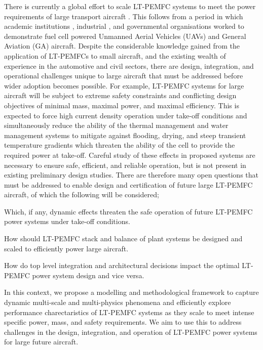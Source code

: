 There is currently a global effort to scale LT-PEMFC systems to meet the power requirements of large transport aircraft \cite{weeksZeroAviaReceivesFAA2025, retallackCommercialAircraftManufacturer2023, NEWBORNNExtGeneration, woodScalabilityHydrogenFuel}.
This follows from a period in which academic institutions \cite{kalloFuelCellSystems2013}, industrial \cite{lapena-reyFirstFuelCellManned2010}, and governmental organisations \cite{noll2004investigation} worked to demonstrate fuel cell powered Unmanned Aerial Vehicles (UAVs) and General Aviation (GA) aircraft.
Despite the considerable knowledge gained from the application of LT-PEMFCs to small aircraft, and the existing wealth of experience in the automotive and civil sectors, there are  design, integration, and operational challenges unique to large aircraft that must be addressed before wider adoption becomes possible.
For example, LT-PEMFC systems for large aircraft will be subject to extreme safety constraints and conflicting design objectives of minimal mass, maximal power, and maximal efficiency. This is expected to force high current density operation under take-off conditions and simultaneously reduce the ability of the thermal management and water management systems to mitigate against flooding, drying, and steep transient temperature gradients which threaten the ability of the cell to provide the required power at take-off. Careful study of these effects in proposed systems are necessary to ensure safe, efficient, and reliable operation, but is not present in existing preliminary design studies.
There are therefore many open questions that must be addressed to enable design and certification of future large LT-PEMFC aircraft, of which the following will be considered; \begin{enumerate*}
	\item Which, if any, dynamic effects threaten the safe operation of future LT-PEMFC power systems under take-off conditions.
	\item How should LT-PEMFC stack and balance of plant systems be designed and scaled to efficiently power large aircraft.
	\item How do top level integration and architectural decisions impact the optimal LT-PEMFC power system design and vice versa.
\end{enumerate*}

In this context, we propose a modelling and methodological framework to capture dynamic multi-scale and multi-physics phenomena and efficiently explore performance charectaristics of LT-PEMFC systems as they scale to meet intense specific power, mass, and safety requirements.
We aim to use this to address challenges in the design, integration, and operation of LT-PEMFC power systems for large future aircraft.

